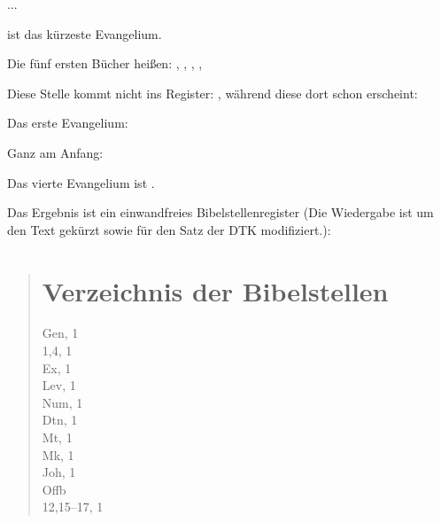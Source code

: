 \begin{lfgwcode}{}
...

\usepackage{bibleref-german} 

\usepackage{bibleref-parse}

\usepackage{imakeidx}

\makeindex[title = Verzeichnis der Bibelstellen]



 ist das kürzeste Evangelium.

Die fünf ersten Bücher heißen:
, , , , 

Diese Stelle kommt nicht ins Register: , 
während diese dort schon erscheint: 

Das erste Evangelium: 

Ganz am Anfang: 

Das vierte Evangelium ist .

\printindex
  
\end{lfgwcode}

Das Ergebnis ist ein einwandfreies Bibelstellenregister 
(Die Wiedergabe ist um den Text gekürzt sowie für den Satz der DTK modifiziert.):

\begin{quotation}
    \section*{Verzeichnis der Bibelstellen}
    Gen, 1\\
    \makebox[7mm]{} 1,4, 1\\
    Ex, 1\\
    Lev, 1\\
    Num, 1\\
    Dtn, 1\\
    Mt, 1\\
    Mk, 1\\
    Joh, 1\\
    Offb\\
    \makebox[7mm]{} 12,15–17, 1    
\end{quotation}


